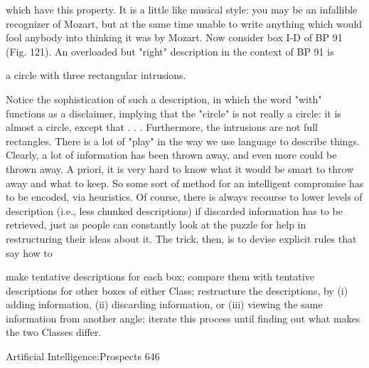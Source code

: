 which have this property. It is a little like musical style: you may be an infallible
recognizer of Mozart, but at the same time unable to write anything which would fool
anybody into thinking it was by Mozart.
        Now consider box I-D of BP 91 (Fig. 121). An overloaded but "right" description
in the context of BP 91 is

                          a circle with three rectangular intrusions.

Notice the sophistication of such a description, in which the word "with" functions as a
disclaimer, implying that the "circle" is not really a circle: it is almost a circle, except that
. . . Furthermore, the intrusions are not full rectangles. There is a lot of "play" in the way
we use language to describe
         things. Clearly, a lot of information has been thrown away, and even more could
be thrown away. A priori, it is very hard to know what it would be smart to throw away
and what to keep. So some sort of method for an intelligent compromise has to be
encoded, via heuristics. Of course, there is always recourse to lower levels of description
(i.e., less chunked descriptions) if discarded information has to be retrieved, just as
people can constantly look at the puzzle for help in restructuring their ideas about it. The
trick, then, is to devise explicit rules that say how to

   make tentative descriptions for each box;
   compare them with tentative descriptions for other boxes of either Class;
   restructure the descriptions, by
       (i) adding information,
       (ii) discarding information,
   or (iii) viewing the same information from another angle; iterate this process until
   finding out what makes the two Classes differ.




Artificial Intelligence:Prospects                                                           646

